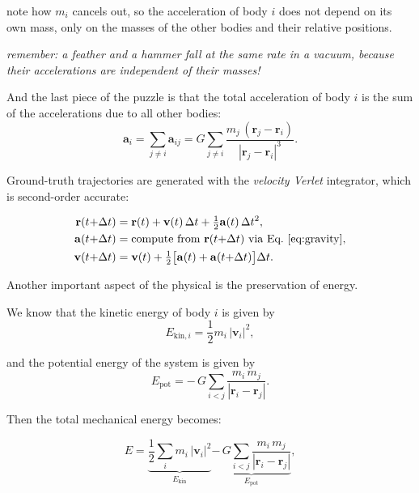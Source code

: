 \documentclass[11pt, a4paper]{article}
\begin{document}
note how $m_i$ cancels out, so the acceleration of body $i$ does not depend on its own mass, only on the masses of the other bodies and their relative positions.

\textit{remember: a feather and a hammer fall at the same rate in a vacuum, because their accelerations are independent of their masses!}

And the last piece of the puzzle is that the total acceleration of body $i$ is the sum of the accelerations due to all other bodies:
\begin{equation}
    \mathbf{a}_i = \sum_{j \neq i} \mathbf{a}_{ij} = G \sum_{j \neq i} \frac{m_j\,(\mathbf{r}_j - \mathbf{r}_i)}{|\mathbf{r}_j - \mathbf{r}_i|^3}.
    \label{eq:gravity}
\end{equation}

Ground-truth trajectories are generated with the \emph{velocity Verlet} integrator, which is second-order
accurate:

\begin{align}
    \mathbf{r}(t {+} \Delta t) &= \mathbf{r}(t) + \mathbf{v}(t)\,\Delta t
                                  + \tfrac{1}{2}\mathbf{a}(t)\,\Delta t^2, \\
    \mathbf{a}(t {+} \Delta t) &= \text{compute from } \mathbf{r}(t {+} \Delta t)
                                  \text{ via Eq.~\eqref{eq:gravity}}, \\
    \mathbf{v}(t {+} \Delta t) &= \mathbf{v}(t)
                                  + \tfrac{1}{2}\bigl[\mathbf{a}(t)
                                  + \mathbf{a}(t {+} \Delta t)\bigr]\Delta t.
\end{align}

Another important aspect of the physical is the preservation of energy.

We know that the kinetic energy of body $i$ is given by
\begin{equation}
       E_{\mathrm{kin}, i} = \frac{1}{2} m_i\,|\mathbf{v}_i|^2,
\end{equation}

and the potential energy of the system is given by
\begin{equation}
       E_{\mathrm{pot}} = -\, G\sum_{i < j} \frac{m_i\,m_j}{|\mathbf{r}_i - \mathbf{r}_j|}.
\end{equation}

Then the total mechanical energy becomes:

\begin{equation}
    E = \underbrace{\frac{1}{2}\sum_i m_i\,|\mathbf{v}_i|^2}_{E_{\mathrm{kin}}}
        \underbrace{-\, G\sum_{i < j}
          \frac{m_i\,m_j}{|\mathbf{r}_i - \mathbf{r}_j|}}_{E_{\mathrm{pot}}},
    \label{eq:energy}
\end{equation}
\end{document}
